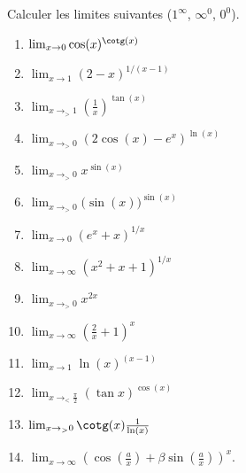 \begin{exercice}\label{exoGeneral0011}

Calculer les limites suivantes ($1^{\infty}$, $\infty^0$, $0^0$).
\begin{multicols}{2}
	
\begin{enumerate}

\item
$\lim_{x\to 0} \cos(x)^{\cotg(x)}$

\item
$\lim_{x\to 1} (2-x)^{1/(x-1)}$

\item
$\lim_{x\to_{>}1 } \left( \frac{1}{ x } \right)^{\tan(x)}$

\item
$\lim_{x\to_{>} 0} (2\cos(x)-e^x)^{\ln(x)}$


\item
$\lim_{x\to_> 0} x^{\sin(x)}$


\item
$\lim_{x\to_> 0} \big( \sin(x) \big)^{\sin(x)}$


\item
$\lim_{x\to 0} ( e^{x}+x)^{1/x}$


\item
$\lim_{x\to\infty } (x^2+x+1)^{1/x}$


\item
$\lim_{x\to_>0} x^{2x}$


\item
$\lim_{x\to \infty} \left( \frac{ 2 }{ x }+1 \right)^{x}$


\item
$\lim_{x\to 1} \ln(x)^{(x-1)}$


\item
$\lim_{x\to_<\frac{ \pi }{ 2 } } (\tan x)^{\cos(x)}$


\item
$\lim_{x\to_>0 } \cotg(x)\frac{1}{ \ln(x) }$


\item
$\lim_{x\to \infty} \left( \cos(\frac{ a }{ x })+\beta\sin(\frac{ a }{ x }) \right)^x$.

\end{enumerate}


\end{multicols}


\end{exercice}
